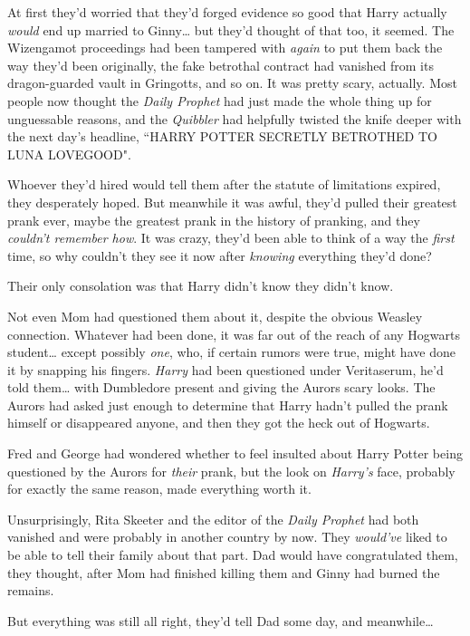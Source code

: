 At first they'd worried that they'd forged evidence so good that Harry actually \emph{would} end up married to Ginny{\ldots} but they'd thought of that too, it seemed. The Wizengamot proceedings had been tampered with \emph{again} to put them back the way they'd been originally, the fake betrothal contract had vanished from its dragon-guarded vault in Gringotts, and so on. It was pretty scary, actually. Most people now thought the \emph{Daily Prophet} had just made the whole thing up for unguessable reasons, and the \emph{Quibbler} had helpfully twisted the knife deeper with the next day's headline, ``HARRY POTTER SECRETLY BETROTHED TO LUNA LOVEGOOD".

Whoever they'd hired would tell them after the statute of limitations expired, they desperately hoped. But meanwhile it was awful, they'd pulled their greatest prank ever, maybe the greatest prank in the history of pranking, and they \emph{couldn't remember how}. It was crazy, they'd been able to think of a way the \emph{first} time, so why couldn't they see it now after \emph{knowing} everything they'd done?

Their only consolation was that Harry didn't know they didn't know.

Not even Mom had questioned them about it, despite the obvious Weasley connection. Whatever had been done, it was far out of the reach of any Hogwarts student{\ldots} except possibly \emph{one}, who, if certain rumors were true, might have done it by snapping his fingers. \emph{Harry} had been questioned under Veritaserum, he'd told them{\ldots} with Dumbledore present and giving the Aurors scary looks. The Aurors had asked just enough to determine that Harry hadn't pulled the prank himself or disappeared anyone, and then they got the heck out of Hogwarts.

Fred and George had wondered whether to feel insulted about Harry Potter being questioned by the Aurors for \emph{their} prank, but the look on \emph{Harry's} face, probably for exactly the same reason, made everything worth it.

Unsurprisingly, Rita Skeeter and the editor of the \emph{Daily Prophet} had both vanished and were probably in another country by now. They \emph{would've} liked to be able to tell their family about that part. Dad would have congratulated them, they thought, after Mom had finished killing them and Ginny had burned the remains.

But everything was still all right, they'd tell Dad some day, and meanwhile{\ldots}

